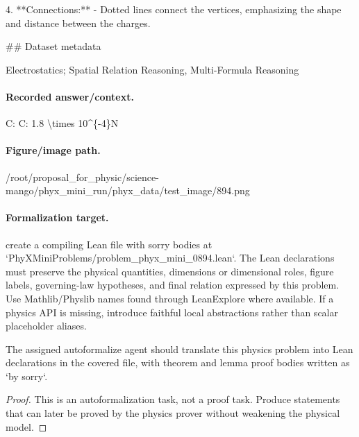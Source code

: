 4. **Connections:**
   - Dotted lines connect the vertices, emphasizing the shape and distance between the charges.

\#\# Dataset metadata

Electrostatics; Spatial Relation Reasoning, Multi-Formula Reasoning

\paragraph{Recorded answer/context.}
C: C: 1.8 \textbackslash{}times 10\textasciicircum{}\{-4\}N

\paragraph{Figure/image path.}
/root/proposal\_for\_physic/science-mango/phyx\_mini\_run/phyx\_data/test\_image/894.png

\paragraph{Formalization target.}
create a compiling Lean file with sorry bodies at `PhyXMiniProblems/problem\_phyx\_mini\_0894.lean`. The Lean declarations must preserve the physical quantities, dimensions or dimensional roles, figure labels, governing-law hypotheses, and final relation expressed by this problem.
Use Mathlib/Physlib names found through LeanExplore where available. If a physics API is missing, introduce faithful local abstractions rather than scalar placeholder aliases.

\begin{theorem}
\label{thm:physics:phyx_mini_0894:target}
The assigned autoformalize agent should translate this physics problem into Lean declarations in the covered file, with theorem and lemma proof bodies written as `by sorry`.
\end{theorem}
\begin{proof}
This is an autoformalization task, not a proof task. Produce statements that can later be proved by the physics prover without weakening the physical model.
\end{proof}

